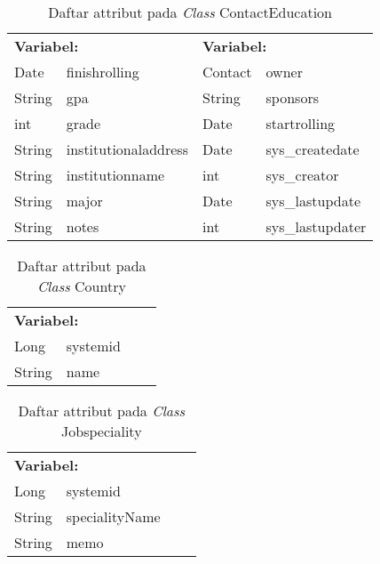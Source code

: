 \begin{table}[H]
	\caption{Daftar attribut pada \textit{Class} ContactEducation}
	\centering
	\small
	\begin{adjustbox}{width=1\textwidth}	
		\begin{tabular}{|p{3cm} p{3.1cm} p{3cm} p{3.1cm}|}
			\hline
			\multicolumn{2}{|l}{\textbf{Variabel:}}&\multicolumn{2}{l|}{\textbf{\textbf{Variabel:}}}\\
			Date&finishrolling&Contact&owner\\
			String&gpa&String&sponsors\\
			int&grade&Date&startrolling\\
			String&institutionaladdress&Date&sys\_createdate\\
			String&institutionname&int&sys\_creator\\
			String&major&Date&sys\_lastupdate\\
			String&notes&int&sys\_lastupdater\\
			\hline
		\end{tabular}
	\end{adjustbox}
\end{table}
\begin{table}[H]
	\caption{Daftar attribut pada \textit{Class} Country}
	\centering
	\small
	\begin{adjustbox}{width=1\textwidth}	
		\begin{tabular}{|p{4cm} p{2.1cm} p{3cm} p{3.1cm}|}
			\hline
			\multicolumn{2}{|l}{\textbf{Variabel:}}&\multicolumn{2}{l|}{\textbf{}}\\
			Long&systemid&&\\
			String&name&&\\
			\hline
		\end{tabular}
	\end{adjustbox}
\end{table}
\begin{table}[H]
	\caption{Daftar attribut pada \textit{Class} Jobspeciality}
	\centering
	\small
	\begin{adjustbox}{width=1\textwidth}	
		\begin{tabular}{|p{5cm} p{3.1cm} p{2cm} p{2.1cm}|}
			\hline
			\multicolumn{2}{|l}{\textbf{Variabel:}}&\multicolumn{2}{l|}{\textbf{}}\\
			Long&systemid&&\\
			String&specialityName&&\\
			String&memo&&\\
			\hline
		\end{tabular}
	\end{adjustbox}
\end{table}
